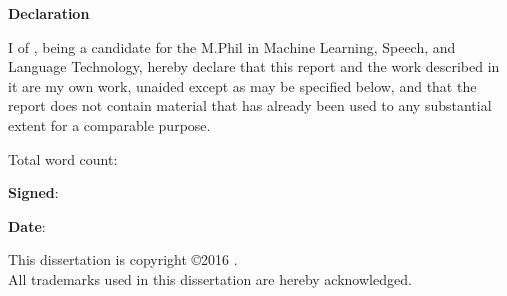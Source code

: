 \newpage
{\Huge \bf Declaration}

\vspace{24pt}

I \authorname of \authorcollege, being a candidate for the M.Phil in Machine
Learning, Speech, and Language Technology, hereby declare that this report and
the work described in it are my own work, unaided except as may be specified
below, and that the report does not contain material that has already been used
to any substantial extent for a comparable purpose.

\vspace{24pt}
Total word count: \wordcount

\vspace{60pt}
\textbf{Signed}:

\vspace{12pt}
\textbf{Date}:


\vfill

This dissertation is copyright \copyright 2016 \authorname.
\\
All trademarks used in this dissertation are hereby acknowledged.



\newpage
\vspace*{\fill}
